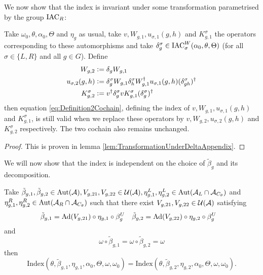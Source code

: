 \documentclass[11pt,a4paper,twoside]{article}
\numberwithin{equation}{section}
\begin{document}
We now show that the index is invariant under some transformation parametrised by the group $\textrm{IAC}_R$:
\begin{lemma}\label{lem:TransformationUnderDelta}
	Take $\omega_0,\theta,\alpha_0,\Theta$ and $\eta_g$ as usual, take $v,W_{g,1},u_{\sigma,1}(g,h)$ and $K_{g,1}^\sigma$ the operators corresponding to these automorphisms and take $\delta^\sigma_g\in\textrm{IAC}_\sigma^W(\alpha_0,\theta,\Theta)$ (for all $\sigma\in\{L,R\}$ and all $g\in G$). Define
	\begin{align}
		W_{g,2}&\vcentcolon=\delta_g W_{g,1}\\
		u_{\sigma,2}(g,h)&\vcentcolon= \delta_g^\sigma W_{g,1}\delta_h^\sigma W_{g,1}^\dagger u_{\sigma,1}(g,h)(\delta_{gh}^\sigma)^\dagger\\
		K^\sigma_{g,2}&\vcentcolon= v^\dagger \delta_g^\sigma v K_{g,1}^\sigma (\delta_g^\sigma)^\dagger
	\end{align}
	then equation \eqref{eq:Definition2Cochain}, defining the index of $v,W_{g,1},u_{\sigma,1}(g,h)$ and $K_{g,1}^\sigma$, is still valid when we replace these operators by $v,W_{g,2},u_{\sigma,2}(g,h)$ and $K_{g,2}^\sigma$ respectively. The two cochain also remains unchanged.
\end{lemma}
\begin{proof}
	This is proven in lemma \ref{lem:TransformationUnderDeltaAppendix}.
\end{proof}
We will now show that the index is independent on the choice of $\tilde{\beta}_g$ and its decomposition.
\begin{lemma}\label{lem:InvarianceUnderChoiceBeta}
	Take $\tilde{\beta}_{g,1},\tilde{\beta}_{g,2}\in\Aut{\AA},V_{g,21},V_{g,22}\in\UU(\AA),\eta_{g,1}^L,\eta_{g,2}^L\in \Aut{\AA_L\cap\AA_{C_\theta}}$ and $\eta_{g,1}^R,\eta_{g,2}^R\in \Aut{\AA_R\cap\AA_{C_\theta}}$ such that there exist $V_{g,21},V_{g,22}\in\mathcal U(\mathcal A)$ satisfying
	\begin{align}\label{eq:InvarianceUnderChoiceBetaTwoBetas}
		\tilde{\beta}_{g,1}&=\Ad{V_{g,21}}\circ\eta_{g,1}\circ\beta^U_g&\tilde{\beta}_{g,2}&=\Ad{V_{g,22}}\circ\eta_{g,2}\circ\beta^U_g
	\end{align}
	and
	\begin{equation}
		\omega\circ\tilde{\beta}_{g,1}=\omega\circ\tilde{\beta}_{g,2}=\omega
	\end{equation}
	then
	\begin{equation}
		\textrm{Index}(\theta,\tilde{\beta}_{g,1},\eta_{g,1},\alpha_{0},\Theta,\omega,\omega_0)=\textrm{Index}(\theta,\tilde{\beta}_{g,2},\eta_{g,2},\alpha_{0},\Theta,\omega,\omega_0).
	\end{equation}
\end{lemma}
\end{document}
